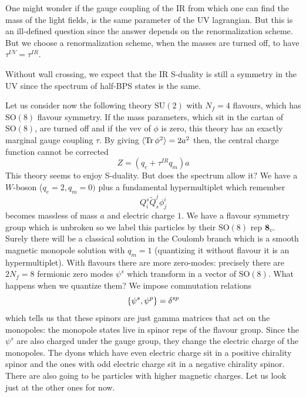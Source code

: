 \documentclass[11pt]{article}
\theoremstyle{definition}
\numberwithin{equation}{section}
\newcommand*\SU{\mathrm{SU}}
\newcommand*\SO{\mathrm{SO}}
\begin{document}
One might wonder if the gauge coupling of the IR from which one can find the mass of the light fields, is the same parameter of the UV lagrangian. But this is an ill-defined question since the answer depends on the renormalization scheme. But we choose a renormalization scheme, when the masses are turned off, to have $\tau^{UV}=\tau^{IR}$.

Without wall crossing, we expect that the IR S-duality is still a symmetry in the UV since the spectrum of half-BPS states is the same.

Let us consider now the following theory $\SU(2)$ with $N_{f}=4$ flavours, which has $\SO(8)$ flavour symmetry. If the mass parameters, which sit in the cartan of $\SO(8)$, are turned off and if the vev of $\phi$ is zero, this theory has an exactly marginal gauge coupling $\tau$. By giving $\langle\operatorname{Tr}\phi^{2}\rangle=2a^{2}$ then, the central charge function cannot be corrected
\begin{equation}
	Z=(q_{e}+\tau^{IR}q_{m})a
\end{equation}
This theory seems to enjoy S-duality. But does the spectrum allow it? We have a $W$-boson ($q_{e}=2,q_{m}=0)$ plus a fundamental hypermultiplet which remember
\begin{equation}
	Q_{i}^{s}\tilde Q_{s}^{j}\phi^{i}_{j}
\end{equation}
becomes massless of mass $a$ and electric charge $1$. We have a flavour symmetry group which is unbroken so we label this particles by their $\SO(8)$ rep $\mathbf{8}_{v}$.\\
Surely there will be a classical solution in the Coulomb branch which is a smooth magnetic monopole solution with $q_{m}=1$ (quantizing it without flavour it is an hypermultiplet). With flavours there are more zero-modes: precisely there are $2N_{f}=8$ fermionic zero modes $\psi^{s}$ which transform in a vector of $\SO(8)$. What happens when we quantize them? We impose commutation relations
\begin{equation}
	\acomm{\psi^{s}}{\psi^{p}}=\delta^{sp}
\end{equation}
which tells us that these spinors are just gamma matrices that act on the monopoles: the monopole states live in spinor reps of the flavour group. Since the $\psi^{s}$ are also charged under the gauge group, they change the electric charge of the monopoles. The dyons
which have even electric charge sit in a positive chirality spinor and the ones with odd electric charge sit in a negative chirality spinor. There are also going to be particles with higher magnetic charges. Let us look just at the other ones for now.		
\end{document}
